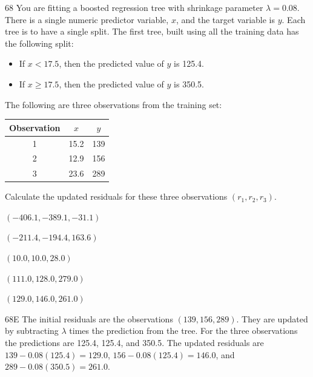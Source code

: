 \begin{question}{68}
You are fitting a boosted regression tree with shrinkage parameter $\lambda = 0.08$. There is a single numeric predictor variable, $x$, and the target variable is $y$. Each tree is to have a single split. The first tree, built using all the training data has the following split:
\begin{itemize}
\item If $x < 17.5$, then the predicted value of $y$ is 125.4.
\item If $x \geqslant 17.5$, then the predicted value of $y$ is 350.5.
\end{itemize}
The following are three observations from the training set:
\begin{center}
\begin{tabular}{|c|c|c|}
\hline
Observation & $x$ & $y$ \\ \hline
1 & 15.2 & 139 \\ \hline
2 & 12.9 & 156 \\ \hline
3 & 23.6 & 289 \\ \hline
\end{tabular}
\end{center}

Calculate the updated residuals for these three observations $(r_1, r_2, r_3)$.

\begin{choices}
\item $(-406.1, -389.1, -31.1)$
\item $(-211.4, -194.4, 163.6)$
\item $(10.0, 10.0, 28.0)$
\item $(111.0, 128.0, 279.0)$
\item $(129.0, 146.0, 261.0)$
\end{choices}
\end{question}
\begin{solution}{68}{E}
The initial residuals are the observations $(139, 156, 289)$. They are updated by subtracting $\lambda$ times the prediction from the tree. For the three observations the predictions are 125.4, 125.4, and 350.5. The updated residuals are $139 - 0.08(125.4) = 129.0$, $156 - 0.08(125.4) = 146.0$, and $289 - 0.08(350.5) = 261.0$.
\end{solution}

